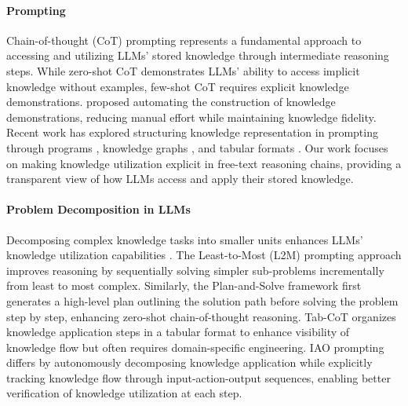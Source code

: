 \paragraph{Prompting}
Chain-of-thought (CoT) prompting represents a fundamental approach to accessing and utilizing LLMs' stored knowledge through intermediate reasoning steps. While zero-shot CoT \cite{kojima2022large} demonstrates LLMs' ability to access implicit knowledge without examples, few-shot CoT \cite{wei2022chain} requires explicit knowledge demonstrations. \citet{zhang2022automatic} proposed automating the construction of knowledge demonstrations, reducing manual effort while maintaining knowledge fidelity. Recent work has explored structuring knowledge representation in prompting through programs \cite{chen2023program}, knowledge graphs \cite{besta2024graph}, and tabular formats \cite{ziqi-lu-2023-tab}. Our work focuses on making knowledge utilization explicit in free-text reasoning chains, providing a transparent view of how LLMs access and apply their stored knowledge.

\paragraph{Problem Decomposition in LLMs}
\begin{comment}
Research has shown that decomposing complex knowledge tasks into smaller units enhances LLMs' knowledge utilization capabilities \cite{shridhar2022automatic}. The Least-to-Most prompting approach \cite{zhou2022least} structures knowledge application by sequentially decomposing problems into manageable knowledge components, offering improved transparency compared to zero-shot CoT. Tab-CoT \cite{ziqi-lu-2023-tab} employs a tabular format to organize knowledge application steps, enhancing the visibility of knowledge flow, though it often requires domain-specific knowledge engineering. IAO prompting differs by autonomously decomposing knowledge application while explicitly tracking knowledge flow through input-action-output sequences, enabling better verification of knowledge utilization at each step.    
\end{comment}

Decomposing complex knowledge tasks into smaller units enhances LLMs' knowledge utilization capabilities \cite{shridhar2022automatic}. The Least-to-Most (L2M) prompting approach \cite{zhou2022least} improves reasoning by sequentially solving simpler sub-problems incrementally from least to most complex. Similarly, the Plan-and-Solve framework \cite{wang2023plan} first generates a high-level plan outlining the solution path before solving the problem step by step, enhancing zero-shot chain-of-thought reasoning. Tab-CoT \cite{ziqi-lu-2023-tab} organizes knowledge application steps in a tabular format to enhance visibility of knowledge flow but often requires domain-specific engineering. IAO prompting differs by autonomously decomposing knowledge application while explicitly tracking knowledge flow through input-action-output sequences, enabling better verification of knowledge utilization at each step.

